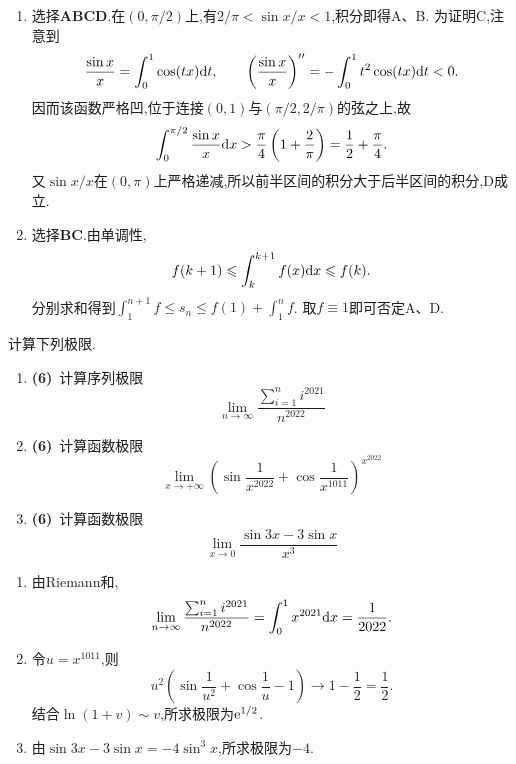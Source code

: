 \documentclass{ctexart}
\begin{document}
\begin{solution}
\begin{enumerate}[label=\textbf{(\arabic*)}]
        \item 选择\textbf{ABCD}.在$(0,\pi/2)$上,有$2/\pi<\sin x/x<1$,积分即得A、B.
            为证明C,注意到
            \[\dfrac{\sin x}{x}=\int_0^1\cos(tx)\mathrm{d} t,\qquad
            \left(\dfrac{\sin x}{x}\right)''=-\int_0^1t^2\cos(tx)\mathrm{d} t<0.\]
            因而该函数严格凹,位于连接$(0,1)$与$(\pi/2,2/\pi)$的弦之上,故
            \[\int_0^{\pi/2}\dfrac{\sin x}{x}\mathrm{d} x>\dfrac\pi4\left(1+\dfrac2\pi\right)=\dfrac12+\dfrac\pi4.\]
            又$\sin x/x$在$(0,\pi)$上严格递减,所以前半区间的积分大于后半区间的积分,D成立.
        \item 选择\textbf{BC}.由单调性,
            \[f(k+1)\leqslant\int_k^{k+1}f(x)\mathrm{d} x\leqslant f(k).\]
            分别求和得到$\int_1^{n+1}f\leqslant s_n\leqslant f(1)+\int_1^nf$.
            取$f\equiv1$即可否定A、D.
    \end{enumerate}
\end{solution}
\begin{problem}[2.(18\songti{分})]
    计算下列极限.
    \begin{enumerate}[label=\textbf{(\arabic*)}]
        \item \textbf{(6)}\ 计算序列极限$$\lim_{n\to\infty}\dfrac{\sum_{i=1}^{n}i^{2021}}{n^{2022}}$$
        \item \textbf{(6)}\ 计算函数极限$$\lim_{x\to+\infty}\left(\sin\dfrac{1}{x^{2022}}+\cos\dfrac{1}{x^{1011}}\right)^{x^{2022}}$$
        \item \textbf{(6)}\ 计算函数极限$$\lim_{x\to0}\dfrac{\sin3x-3\sin x}{x^3}$$
    \end{enumerate}
\end{problem}
\begin{solution}
\begin{enumerate}[label=\textbf{(\arabic*)}]
        \item 由Riemann和,
            \[\lim_{n\to\infty}\dfrac{\sum_{i=1}^ni^{2021}}{n^{2022}}
            =\int_0^1x^{2021}\mathrm{d} x=\dfrac1{2022}.\]
        \item 令$u=x^{1011}$,则
            \[u^2\left(\sin\dfrac1{u^2}+\cos\dfrac1u-1\right)\to1-\dfrac12=\dfrac12.\]
            结合$\ln(1+v)\sim v$,所求极限为$\mathrm{e}^{1/2}$.
        \item 由$\sin3x-3\sin x=-4\sin^3x$,所求极限为$-4$.
    \end{enumerate}
\end{solution}
\end{document}
